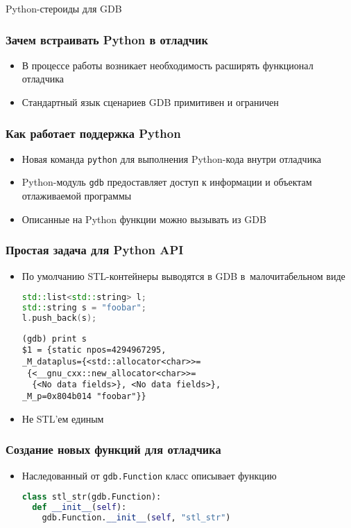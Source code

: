 \documentclass[onlymath]{beamer}
\newcommand\code\texttt
\begin{document}
\begin{subsection}{Python-стероиды для GDB}
\begin{frame}
  \frametitle{Зачем встраивать Python в отладчик}
  \begin{itemize}
  \item В процессе работы возникает необходимость расширять функционал
    отладчика
  \item Стандартный язык сценариев GDB примитивен и ограничен
  \end{itemize}
\end{frame}

\begin{frame}
  \frametitle{Как работает поддержка Python}
  \begin{itemize}
  \item Новая команда \code{python} для выполнения Python-кода внутри
    отладчика
  \item Python-модуль \code{gdb} предоставляет доступ к информации и
    объектам отлаживаемой программы
  \item Описанные на Python функции можно вызывать из GDB
  \end{itemize}
\end{frame}

\begin{frame}[fragile]
  \frametitle{Простая задача для Python API}
  \begin{itemize}
  \item По умолчанию STL-контейнеры выводятся в GDB в малочитабельном
    виде
\begin{lstlisting}[language=C++]
std::list<std::string> l;
std::string s = "foobar";
l.push_back(s);
\end{lstlisting}
\begin{lstlisting}[language=gdb,frameround=tttt]
(gdb) print s
$1 = {static npos=4294967295, 
_M_dataplus={<std::allocator<char>>= 
 {<__gnu_cxx::new_allocator<char>>=
  {<No data fields>}, <No data fields>},
_M_p=0x804b014 "foobar"}}
\end{lstlisting}
\item Не STL’ем единым
  \end{itemize}
\end{frame}

\begin{frame}[fragile]
  \frametitle{Создание новых функций для отладчика}
  \begin{itemize}
  \item Наследованный от \code{gdb.Function} класс описывает функцию
\begin{lstlisting}[language=Python]
class stl_str(gdb.Function):
  def __init__(self):
    gdb.Function.__init__(self, "stl_str")


\end{lstlisting}
\end{itemize}
\end{frame}
\end{subsection}
\end{document}
